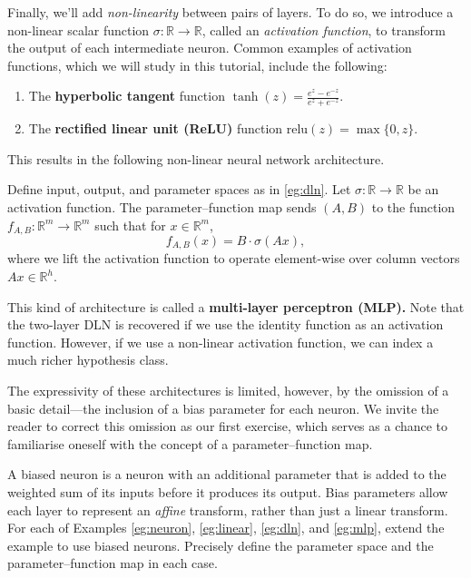 \documentclass[11pt]{article}
\newcommand{\R}{\mathbb{R}}
\newcommand{\relu}{\mathrm{relu}}
\begin{document}
Finally, we'll add \emph{non-linearity} between pairs of layers. To do so, we
introduce a non-linear scalar function $\sigma : \R \to \R$, called an
\emph{activation function}, to transform the output of each intermediate
neuron. Common examples of activation functions, which we will study in this
tutorial, include the following:
\begin{enumerate}
    \item
        The \textbf{hyperbolic tangent} function
            $\displaystyle \tanh(z) = \frac{e^z-e^{-z}}{e^z + e^{-z}}$.
    \item
        The \textbf{rectified linear unit (ReLU)} function $\relu(z) = \max\{0, z\}$.
\end{enumerate}
This results in the following non-linear neural network architecture.

\begin{example}\label{eg:mlp}
    Define input, output, and parameter spaces as in \cref{eg:dln}.
    Let $\sigma : \R \to \R$ be an activation function.
    The parameter--function map sends $(A, B)$ to the function
        $f_{A,B} : \R^m \to \R^m$ such that for $x \in \R^m$,
    \begin{equation}
        f_{A,B}(x)
        = B \cdot \sigma( A x ),
    \end{equation}
    where we lift the activation function to operate element-wise over column
    vectors $A x \in \R^h$.
\end{example}
This kind of architecture is called a \textbf{multi-layer perceptron (MLP).}
Note that the two-layer DLN is recovered if we use the identity function as an
activation function. However, if we use a non-linear activation function, we
can index a much richer hypothesis class.

The expressivity of these architectures is limited, however, by the omission of
a basic detail---the inclusion of a bias parameter for each neuron. We invite
the reader to correct this omission as our first exercise, which serves as a
chance to familiarise oneself with the concept of a parameter--function map.

\begin{exercise}
\label{ex:biased-neurons}
    A biased neuron is a neuron with an additional parameter that is added to
    the weighted sum of its inputs before it produces its output. Bias
    parameters allow each layer to represent an \emph{affine} transform, rather
    than just a linear transform. For each of Examples \ref{eg:neuron},
    \ref{eg:linear}, \ref{eg:dln}, and \ref{eg:mlp}, extend the example to use
    biased neurons. Precisely define the parameter space and the
    parameter--function map in each case.
\end{exercise}
\end{document}
